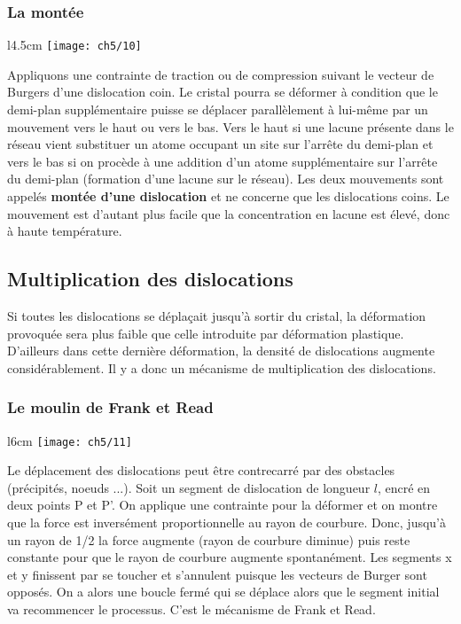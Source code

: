 	\subsubsection{La montée}
		\begin{wrapfigure}[6]{l}{4.5cm}
		\vspace{-5mm}
		\texttt{[image: ch5/10]}
		\end{wrapfigure}
		Appliquons une contrainte de traction ou de compression suivant le vecteur de Burgers d'une dislocation coin. Le cristal pourra se déformer à condition que le demi-plan supplémentaire puisse se déplacer parallèlement à lui-même par un mouvement vers le haut ou vers le bas. Vers le haut si une lacune présente dans le réseau vient substituer un atome occupant un site sur l'arrête du demi-plan et vers le bas si on procède à une addition d'un atome supplémentaire sur l'arrête du demi-plan (formation d'une lacune sur le réseau). Les deux mouvements sont appelés \textbf{montée d'une dislocation} et ne concerne que les dislocations coins. Le mouvement est d'autant plus facile que la concentration en lacune est élevé, donc à haute température.
			
	\subsection{Multiplication des dislocations}
		Si toutes les dislocations se déplaçait jusqu'à sortir du cristal, la déformation provoquée sera plus faible que celle introduite par déformation plastique. D'ailleurs dans cette dernière déformation, la densité de dislocations augmente considérablement. Il y a donc un mécanisme de multiplication des dislocations. 
		
		\subsubsection{Le moulin de Frank et Read}
			\begin{wrapfigure}[8]{l}{6cm}
		\vspace{-5mm}
		\texttt{[image: ch5/11]}
		\end{wrapfigure}
			Le déplacement des dislocations peut être contrecarré par des obstacles (précipités, noeuds ...). Soit un segment de dislocation de longueur $l$, encré en deux points P et P'. On applique une contrainte pour la déformer et on montre que la force est inversément proportionnelle au rayon de courbure. Donc, jusqu'à un rayon de 1/2 la force augmente (rayon de courbure diminue) puis reste constante pour que le rayon de courbure augmente spontanément. Les segments x et y finissent par se toucher et s'annulent puisque les vecteurs de Burger sont opposés. On a alors une boucle fermé qui se déplace alors que le segment initial va recommencer le processus. C'est le mécanisme de Frank et Read. 
			

